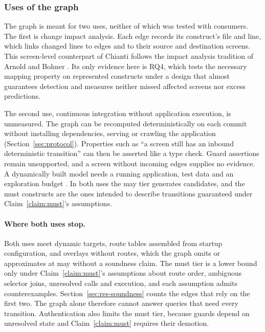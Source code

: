 \subsubsection{Uses of the graph}
\label{sec:uses}

The graph is meant for two uses, neither of which was tested with consumers. The first is change
impact analysis. Each edge records its construct's file and line, which links changed lines to
edges and to their source and destination screens. This screen-level counterpart of Chianti
\cite{ren2004chianti} follows the impact analysis tradition of Arnold and Bohner
\cite{arnold1993impact,bohner1996software,lehnert2011taxonomy}. Its only evidence here is RQ4,
which tests the necessary mapping property on represented constructs under a design that almost
guarantees detection and measures neither missed affected screens nor excess predictions.

The second use, continuous integration without application execution, is unmeasured. The graph can
be recomputed deterministically on each commit without installing dependencies, serving or crawling
the application (Section~\ref{sec:protocol}). Properties such as ``a screen still has an inbound
deterministic transition'' can then be asserted like a type check. Guard assertions remain
unsupported, and a screen without incoming edges supplies no evidence. A dynamically built model
needs a running application, test data and an exploration budget
\cite{crawljax2012,feedex2013,websurvey2025}. In both uses the may tier generates candidates, and
the must constructs are the ones intended to describe transitions guaranteed under
Claim~\ref{claim:must}'s assumptions.

\paragraph{Where both uses stop.}
Both uses meet dynamic targets, route tables assembled from startup configuration, and overlays
without routes, which the graph omits or approximates at may without a soundness claim. The must
tier is a lower bound only under Claim~\ref{claim:must}'s assumptions about route order, ambiguous
selector joins, unresolved calls and execution, and each assumption admits counterexamples.
Section~\ref{sec:res-soundness} counts the edges that rely on the first two. The graph alone therefore
cannot answer queries that need every transition. Authentication also limits the must tier, because
guards depend on unresolved state and Claim~\ref{claim:must} requires their demotion.

